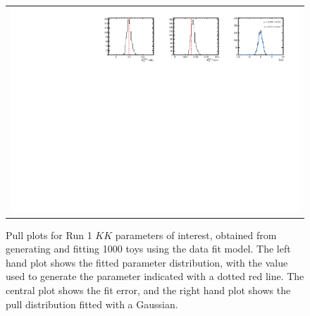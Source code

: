 \begin{figure}
\begin{tabular}{c}
\includegraphics[width=\textwidth]{ANA_resources/Plots/Data_fit/FitterBias//R_ds_KK_run1.pdf} \\
  \end{tabular}
  \caption{Pull plots for Run 1 $KK$ parameters of interest, obtained from generating and fitting 1000 toys using the data fit model. The left hand plot shows the fitted parameter distribution, with the value used to generate the parameter indicated with a dotted red line. The central plot shows the fit error, and the right hand plot shows the pull distribution fitted with a Gaussian.}
\label{fig:KK_run1_pulls}
\end{figure}
